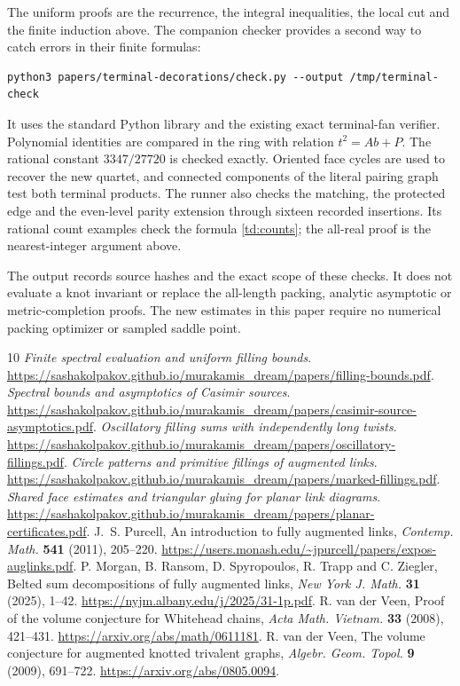 \documentclass[11pt]{article}
\numberwithin{equation}{section}
\theoremstyle{definition}
\begin{document}
The uniform proofs are the recurrence, the integral inequalities,
the local cut and the finite induction above. The companion
checker provides a second way to catch errors in their finite
formulas:
\begin{verbatim}
python3 papers/terminal-decorations/check.py --output /tmp/terminal-check
\end{verbatim}
It uses the standard Python library and the existing exact
terminal-fan verifier. Polynomial identities are compared in the
ring with relation \(t^2=Ab+P\). The rational constant
\(3347/27720\) is checked exactly. Oriented face cycles are
used to recover the new quartet, and connected components of
the literal pairing graph test both terminal products.
The runner also checks the matching, the protected edge and
the even-level parity extension through sixteen recorded
insertions. Its rational count examples check
the formula \eqref{td:counts}; the all-real proof is the
nearest-integer argument above.

The output records source hashes and the exact scope of these
checks. It does not evaluate a knot invariant or replace the
all-length packing, analytic asymptotic or metric-completion
proofs. The new estimates in this paper require no numerical
packing optimizer or sampled saddle point.

\begin{thebibliography}{10}
\emph{Finite spectral evaluation and uniform filling bounds}.
\url{https://sashakolpakov.github.io/murakamis_dream/papers/filling-bounds.pdf}.
 \emph{Spectral bounds and asymptotics of Casimir sources}.
\url{https://sashakolpakov.github.io/murakamis_dream/papers/casimir-source-asymptotics.pdf}.
\emph{Oscillatory filling sums with independently long twists}.
\url{https://sashakolpakov.github.io/murakamis_dream/papers/oscillatory-fillings.pdf}.
\emph{Circle patterns and primitive fillings of augmented links}.
\url{https://sashakolpakov.github.io/murakamis_dream/papers/marked-fillings.pdf}.
\emph{Shared face estimates and triangular gluing for planar link diagrams}.
\url{https://sashakolpakov.github.io/murakamis_dream/papers/planar-certificates.pdf}.
J.~S. Purcell, An introduction to fully augmented links,
\emph{Contemp. Math.} \textbf{541} (2011), 205--220.
\url{https://users.monash.edu/~jpurcell/papers/expos-auglinks.pdf}.
P. Morgan, B. Ransom, D. Spyropoulos, R. Trapp and C. Ziegler,
Belted sum decompositions of fully augmented links,
\emph{New York J. Math.} \textbf{31} (2025), 1--42.
\url{https://nyjm.albany.edu/j/2025/31-1p.pdf}.
R. van der Veen, Proof of the volume conjecture for Whitehead chains,
\emph{Acta Math. Vietnam.} \textbf{33} (2008), 421--431.
\url{https://arxiv.org/abs/math/0611181}.
R. van der Veen, The volume conjecture for augmented knotted
trivalent graphs, \emph{Algebr. Geom. Topol.} \textbf{9} (2009),
691--722.
\url{https://arxiv.org/abs/0805.0094}.
\end{thebibliography}
\end{document}
